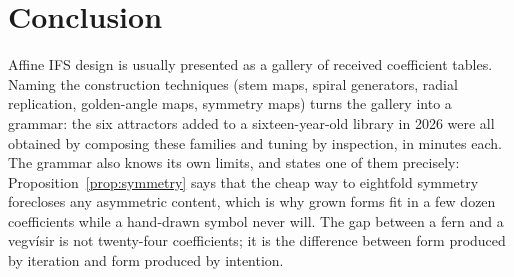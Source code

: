 \documentclass[11pt,a4paper]{article}
\theoremstyle{remark}
\begin{document}
\section{Conclusion}

Affine IFS design is usually presented as a gallery of received coefficient
tables. Naming the construction techniques (stem maps, spiral generators,
radial replication, golden-angle maps, symmetry maps) turns the gallery into
a grammar: the six attractors added to a sixteen-year-old library in 2026 were
all obtained by composing these families and tuning by inspection, in minutes
each. The
grammar also knows its own limits, and states one of them precisely:
Proposition~\ref{prop:symmetry} says that the cheap way to eightfold
symmetry forecloses any asymmetric content, which is why grown forms fit in
a few dozen coefficients while a hand-drawn symbol never will. The gap
between a fern and a vegvísir is not twenty-four coefficients; it is the
difference between form produced by iteration and form produced by
intention.



\end{document}
